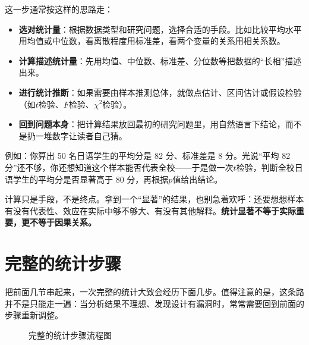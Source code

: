 \documentclass[lang=cn,10pt]{elegantbook}
\begin{document}
这一步通常按这样的思路走：
\begin{itemize}
  \item \textbf{选对统计量}：根据数据类型和研究问题，选择合适的手段。比如比较平均水平用均值或中位数，看离散程度用标准差，看两个变量的关系用相关系数。
  \item \textbf{计算描述统计量}：先用均值、中位数、标准差、分位数等把数据的“长相”描述出来。
  \item \textbf{进行统计推断}：如果需要由样本推测总体，就做点估计、区间估计或假设检验（如$t$检验、$F$检验、$\chi^2$检验）。
  \item \textbf{回到问题本身}：把计算结果放回最初的研究问题里，用自然语言下结论，而不是扔一堆数字让读者自己猜。
\end{itemize}

例如：你算出 50 名日语学生的平均分是 82 分、标准差是 8 分。光说“平均 82 分”还不够，你还想知道这个样本能否代表全校——于是做一次$t$检验，判断全校日语学生的平均分是否显著高于 80 分，再根据$p$值给出结论。

\begin{remark}
计算只是手段，不是终点。拿到一个“显著”的结果，也别急着欢呼：还要想想样本有没有代表性、效应在实际中够不够大、有没有其他解释。\textbf{统计显著不等于实际重要，更不等于因果关系。}
\end{remark}



\section{完整的统计步骤}
把前面几节串起来，一次完整的统计大致会经历下面几步。值得注意的是，这条路并不是只能走一遍：当分析结果不理想、发现设计有漏洞时，常常需要回到前面的步骤重新调整。

\begin{figure}[htbp]
  \centering
  \caption{完整的统计步骤流程图}
\end{figure}
\end{document}
